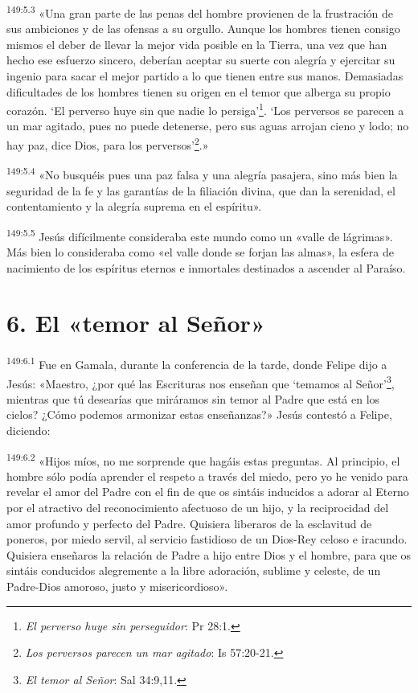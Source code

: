 \par
\textsuperscript{149:5.3} «Una gran parte de las penas del hombre provienen de la frustración de sus ambiciones y de las ofensas a su orgullo. Aunque los hombres tienen consigo mismos el deber de llevar la mejor vida posible en la Tierra, una vez que han hecho ese esfuerzo sincero, deberían aceptar su suerte con alegría y ejercitar su ingenio para sacar el mejor partido a lo que tienen entre sus manos. Demasiadas dificultades de los hombres tienen su origen en el temor que alberga su propio corazón. `El perverso huye sin que nadie lo persiga'\footnote{\textit{El perverso huye sin perseguidor}: Pr 28:1.}. `Los perversos se parecen a un mar agitado, pues no puede detenerse, pero sus aguas arrojan cieno y lodo; no hay paz, dice Dios, para los perversos'\footnote{\textit{Los perversos parecen un mar agitado}: Is 57:20-21.}.»

\par
\textsuperscript{149:5.4} «No busquéis pues una paz falsa y una alegría pasajera, sino más bien la seguridad de la fe y las garantías de la filiación divina, que dan la serenidad, el contentamiento y la alegría suprema en el espíritu».

\par
\textsuperscript{149:5.5} Jesús difícilmente consideraba este mundo como un «valle de lágrimas». Más bien lo consideraba como «el valle donde se forjan las almas», la esfera de nacimiento de los espíritus eternos e inmortales destinados a ascender al Paraíso.

\section*{6. El «temor al Señor»}
\par
\textsuperscript{149:6.1} Fue en Gamala, durante la conferencia de la tarde, donde Felipe dijo a Jesús: «Maestro, ¿por qué las Escrituras nos enseñan que `temamos al Señor'\footnote{\textit{El temor al Señor}: Sal 34:9,11.}, mientras que tú desearías que miráramos sin temor al Padre que está en los cielos? ¿Cómo podemos armonizar estas enseñanzas?» Jesús contestó a Felipe, diciendo:

\par
\textsuperscript{149:6.2} «Hijos míos, no me sorprende que hagáis estas preguntas. Al principio, el hombre sólo podía aprender el respeto a través del miedo, pero yo he venido para revelar el amor del Padre con el fin de que os sintáis inducidos a adorar al Eterno por el atractivo del reconocimiento afectuoso de un hijo, y la reciprocidad del amor profundo y perfecto del Padre. Quisiera liberaros de la esclavitud de poneros, por miedo servil, al servicio fastidioso de un Dios-Rey celoso e iracundo. Quisiera enseñaros la relación de Padre a hijo entre Dios y el hombre, para que os sintáis conducidos alegremente a la libre adoración, sublime y celeste, de un Padre-Dios amoroso, justo y misericordioso».

